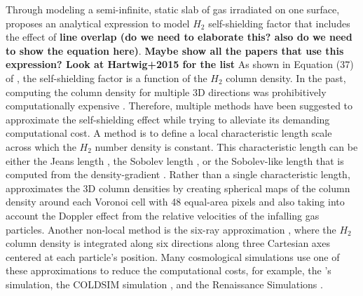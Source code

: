 \documentclass[linenumbers, twocolumn]{aastex631}
\begin{document}
Through modeling a semi-infinite, static slab of gas irradiated on one surface, \cite{Draine+1996} proposes an analytical expression to model $H_{2}$ self-shielding factor that includes the effect of \textbf{line overlap (do we need to elaborate this? also do we need to show the equation here)}. \textbf{Maybe show all the papers that use this expression? Look at Hartwig+2015 for the list} As shown in Equation (37) of \cite{Draine+1996}, the self-shielding factor is a function of the $H_{2}$ column density. In the past, computing the column density for multiple 3D directions was prohibitively computationally expensive \citep{Shang+2010, Wolcott-Green+2011}. Therefore, multiple methods have been suggested to approximate the self-shielding effect while trying to alleviate its demanding computational cost. A method is to define a local characteristic length scale across which the $H_{2}$ number density is constant. This characteristic length can be either the Jeans length \citep{Shang+2010, Johnson+2011}, the Sobolev length \citep{Sobolev+1957,Yoshida+2006}, or the Sobolev-like length that is computed from the density-gradient \citep{Gnedin+2009, Gnedin+2011}. Rather than a single characteristic length, \cite{Hartwig+2015} approximates the 3D column densities by creating spherical maps of the column density around each Voronoi cell with 48 equal-area pixels and also taking into account the Doppler effect from the relative velocities of the infalling gas particles. Another non-local method is the six-ray approximation \citep{Yoshida+2003,Yoshida+2007,Glover+2007, Glover+2007a}, where the $H_{2}$ column density is integrated along six directions along three Cartesian axes centered at each particle's position. Many cosmological simulations use one of these approximations to reduce the computational costs, for example, the \citealp{Christensen+2012}'s simulation, the COLDSIM simulation \citep{Maio+2022}, and the Renaissance Simulations \citep{OShea+2015}.
\end{document}
